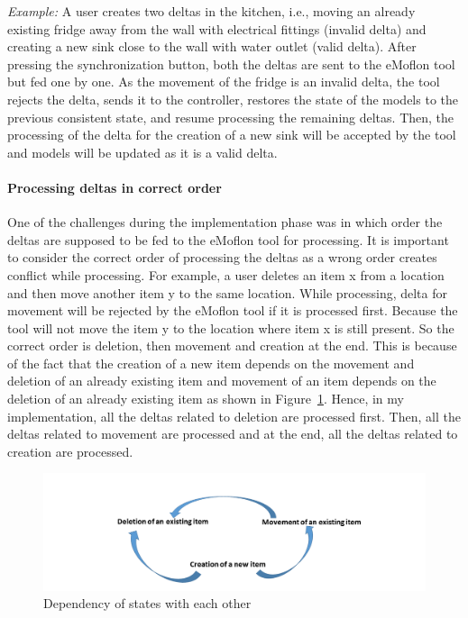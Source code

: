 \textit{Example:} A user creates two deltas in the kitchen, i.e., moving an already existing fridge away from the wall with electrical fittings (invalid delta) and creating a new sink close to the wall with water outlet (valid delta). After pressing the synchronization button, both the deltas are sent to the eMoflon tool but fed one by one. As the movement of the fridge is an invalid delta, the tool rejects the delta, sends it to the controller, restores the state of the models to the previous consistent state, and resume processing the remaining deltas. Then, the processing of the delta for the creation of a new sink will be accepted by the tool and models will be updated as it is a valid delta.

\paragraph{Processing deltas in correct order}
One of the challenges during the implementation phase was in which order the deltas are supposed to be fed to the eMoflon tool for processing. It is important to consider the correct order of processing the deltas as a wrong order creates conflict while processing. For example, a user deletes an item x from a location and then move another item y to the same location. While processing, delta for movement will be rejected by the eMoflon tool if it is processed first. Because the tool will not move the item y to the location where item x is still present. So the correct order is deletion, then movement and creation at the end. This is because of the fact that the creation of a new item depends on the movement and deletion of an already existing item and movement of an item depends on the deletion of an already existing item as shown in Figure~\ref{fig:State_Dependency}. Hence, in my implementation, all the deltas related to deletion are processed first. Then, all the deltas related to movement are processed and at the end, all the deltas related to creation are processed.  

\begin{figure}
	\includegraphics[width=1\textwidth]{figures/State_Dependency}
	\caption{Dependency of states with each other}
	\label{fig:State_Dependency}
\end{figure}

